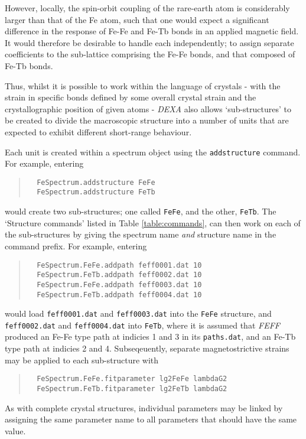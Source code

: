 \documentclass[a4paper,12pt]{report}
\newcommand{\dexa}{\emph{DEXA} }
\newcommand{\feff}{\emph{FEFF} }
\begin{document}
However, locally, the spin-orbit coupling of the rare-earth atom is considerably larger than that of the Fe atom, such that one would expect a significant difference in the response of Fe-Fe and Fe-Tb bonds in an applied magnetic field. It would therefore be desirable to handle each independently; to assign separate coefficients to the sub-lattice comprising the Fe-Fe bonds, and that composed of Fe-Tb bonds.

Thus, whilst it is possible to work within the language of crystals - with the strain in specific bonds defined by some overall crystal strain and the crystallographic position of given atoms - \dexa also allows `sub-structures' to be created to divide the macroscopic structure into a number of units that are expected to exhibit different short-range behaviour.

Each unit is created within a spectrum object using the \verb|addstructure| command. For example, entering

\begin{quote}
  \begin{verbatim}
  FeSpectrum.addstructure FeFe
  FeSpectrum.addstructure FeTb
  \end{verbatim}
\end{quote}
would create two sub-structures; one called \verb|FeFe|, and the other, \verb|FeTb|. The `Structure commands' listed in Table \ref{table:commands}, can then work on each of the sub-structures by giving the spectrum name \emph{and} structure name in the command prefix. For example, entering
\begin{quote}
  \begin{verbatim}
  FeSpectrum.FeFe.addpath feff0001.dat 10
  FeSpectrum.FeTb.addpath feff0002.dat 10
  FeSpectrum.FeFe.addpath feff0003.dat 10
  FeSpectrum.FeTb.addpath feff0004.dat 10
  \end{verbatim}
\end{quote}
would load \verb|feff0001.dat| and \verb|feff0003.dat| into the \verb|FeFe| structure, and \verb|feff0002.dat| and \verb|feff0004.dat| into \verb|FeTb|, where it is assumed that \feff produced an Fe-Fe type path at indicies 1 and 3 in its \verb|paths.dat|, and an Fe-Tb type path at indicies 2 and 4. Subseqeuently, separate magnetostrictive strains may be applied to each sub-structure with
\begin{quote}
  \begin{verbatim}
  FeSpectrum.FeFe.fitparameter lg2FeFe lambdaG2
  FeSpectrum.FeTb.fitparameter lg2FeTb lambdaG2
  \end{verbatim}
\end{quote}
As with complete crystal structures, individual parameters may be linked by assigning the same parameter name to all parameters that should have the same value.
\end{document}
